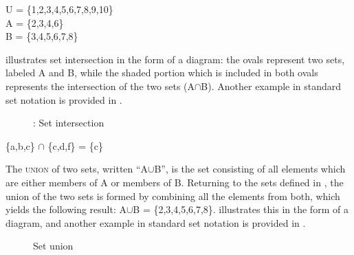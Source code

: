 \ea
U = \{1,2,3,4,5,6,7,8,9,10\}\\
A = \{2,3,4,6\}\\
B = \{3,4,5,6,7,8\}
\z


 illustrates set intersection in the form of a diagram: the ovals represent two sets, labeled A and B, while the shaded portion which is included in both ovals represents the intersection of the two sets (A${\cap}$B). Another example in standard set notation is provided in .

\begin{figure}
 


\caption{\label{fig:key:2}: Set intersection}
\end{figure}

\begin{stylepoints}
\{a,b,c\} ${\cap}$ \{c,d,f\} = \{c\}
\end{stylepoints}


The \textsc{union} of two sets, written “A${\cup}$B”, is the set consisting of all elements which are either members of A or members of B. Returning to the sets defined in , the union of the two sets is formed by combining all the elements from both, which yields the following result: A${\cup}$B = \{2,3,4,5,6,7,8\}.  illustrates this in the form of a diagram, and another example in standard set notation is provided in .


\begin{figure}

\caption{\label{fig:key:3}Set union}
\end{figure}

